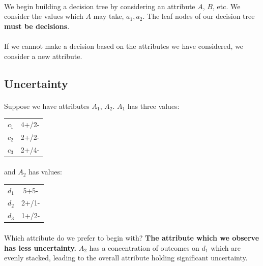 \documentclass[letterpaper,12pt]{article}
\begin{document}
\paragraph{}We begin building a decision tree by considering an attribute $A$, $B$, etc. We
consider the values which $A$ may take, $a_1, a_2$. The leaf nodes of our
decision tree \textbf{must be decisions}.

\paragraph{}If we cannot make a decision based on the attributes we have considered, we consider
a new attribute.

\subsection*{Uncertainty}
\paragraph{}Suppose we have attributes $A_1$, $A_2$. $A_1$ has three values:
\begin{table}[H]
    \centering
    \begin{tabular}{c c}
        $c_1$ & 4+/2-\\
        $c_2$ & 2+/2-\\
        $c_3$ & 2+/4-\\
    \end{tabular}
\end{table}
\paragraph{}and $A_2$ has values:
\begin{table}[H]
    \centering
    \begin{tabular}{c c}
        $d_1$ & 5+5-\\
        $d_2$ & 2+/1-\\
        $d_3$ & 1+/2-\\
    \end{tabular}
\end{table}
\paragraph{}Which attribute do we prefer to begin with? \textbf{The attribute which we observe
has less uncertainty.} $A_2$ has a concentration of outcomes on $d_1$ which are evenly stacked,
leading to the overall attribute holding significant uncertainty.
\end{document}

